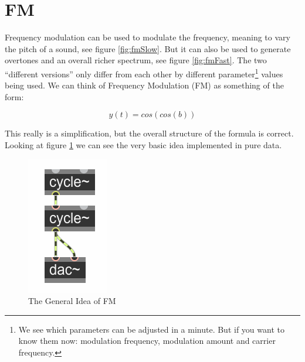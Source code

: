 
\section{FM} %
\label{sub:FM}

Frequency modulation can be used to modulate the frequency, meaning to vary the pitch of a sound, see figure \ref{fig:fmSlow}. But it can also be used to generate overtones and an overall richer spectrum, see figure \ref{fig:fmFast}. The two ``different versions'' only differ from each other by different parameter\footnote{We see which parameters can be adjusted in a minute. But if you want to know them now: modulation frequency, modulation amount and carrier frequency.} values being used.
We can think of Frequency Modulation (FM) as something of the form:

\begin{equation}
	y(t) = cos(cos(b))
\end{equation}

This really is a simplification, but the overall structure of the formula is correct.
Looking at figure \ref{fig:fmIdea} we can see the very basic idea implemented in pure data.
\begin{figure}[H]
	\begin{center}
		\includegraphics{img/FMgeneral.png}
		\caption{The General Idea of FM}
		\label{fig:fmIdea}
	\end{center}
\end{figure}

